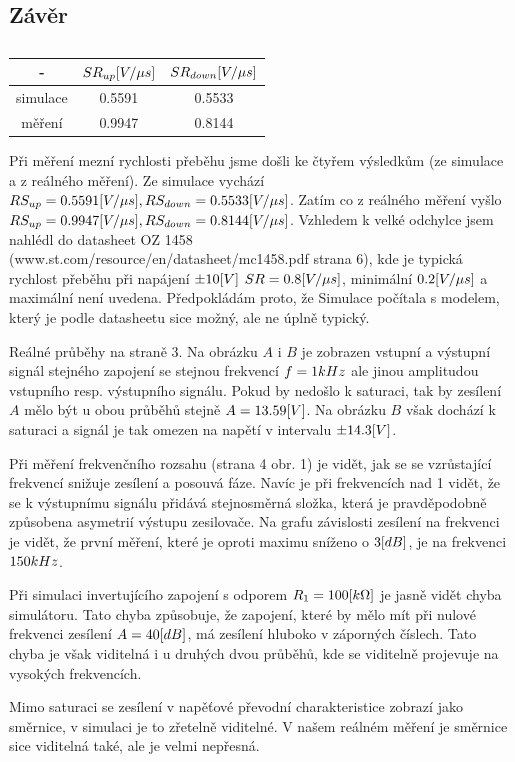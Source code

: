 \documentclass{article}
\begin{document}
\subsection{Závěr}

\begin{table}[H]
  \begin{tabular}{|c|c|c|} 
    \hline
    -               & \(SR_{up}\-[V/\mu s]\)  & \(SR_{down}\-[V/\mu s]\) \\ \hline
    simulace        & 0.5591                  & 0.5533                   \\ \hline
    měření          & 0.9947                  & 0.8144                   \\\hline
  \end{tabular}
  \normalsize
  \caption{\label{tab_pracovni_bod_rozladeni1}}
\end{table}

Při měření mezní rychlosti přeběhu jsme došli ke čtyřem výsledkům (ze simulace a z reálného měření).
Ze simulace vychází \(RS_{up} = 0.5591\-[V/\mu s], RS_{down} = 0.5533\-[V/\mu s]\).
Zatím co z reálného měření vyšlo \(RS_{up} = 0.9947\-[V/\mu s], RS_{down} = 0.8144\-[V/\mu s]\).
Vzhledem k velké odchylce jsem nahlédl do datasheet OZ 1458 \\(www.st.com/resource/en/datasheet/mc1458.pdf strana 6), kde je typická rychlost přeběhu při napájení \(\pm 10\-[V]\) \(SR = 0.8\-[V/\mu s]\), minimální \(0.2\-[V/\mu s]\) a maximální není uvedena.
Předpokládám proto, že Simulace počítala s modelem, který je podle datasheetu sice možný, ale ne úplně typický.

Reálné průběhy na straně 3.
Na obrázku \(A\) i \(B\) je zobrazen vstupní a výstupní signál stejného zapojení se stejnou frekvencí \(f = 1\-{kHz}\) ale jinou amplitudou vstupního resp. výstupního signálu. 
Pokud by nedošlo k saturaci, tak by zesílení \(A\) mělo být u obou průběhů stejně \(A = 13.59\-[V]\).
Na obrázku \(B\) však dochází k saturaci a signál je tak omezen na napětí v intervalu \(\pm 14.3\-[V]\).

Při měření frekvenčního rozsahu (strana 4 obr. 1) je vidět, jak se se vzrůstající frekvencí snižuje zesílení a posouvá fáze.
Navíc je při frekvencích nad 1 vidět, že se k výstupnímu signálu přidává stejnosměrná složka, která je pravděpodobně způsobena asymetrií výstupu zesilovače.
Na grafu závislosti zesílení na frekvenci je vidět, že první měření, které je oproti maximu sníženo o \(3\-[dB]\), je na frekvenci \(150\-{kHz}\).

Při simulaci invertujícího zapojení s odporem \(R_1 = 100\-[k\Omega]\) je jasně vidět chyba simulátoru.
Tato chyba způsobuje, že zapojení, které by mělo mít při nulové frekvenci zesílení \(A = 40\-[dB]\), má zesílení hluboko v záporných číslech.
Tato chyba je však viditelná i u druhých dvou průběhů, kde se viditelně projevuje na vysokých frekvencích.

Mimo saturaci se zesílení v napěťové převodní charakteristice zobrazí jako směrnice, v simulaci je to zřetelně viditelné.
V našem reálném měření je směrnice sice viditelná také, ale je velmi nepřesná.
\end{document}

